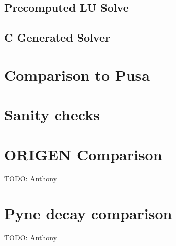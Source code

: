 \documentclass{article}
\makeatletter
\let\oldcite=\cite
\renewcommand\cite[1]{\ifthenelse{\equal{#1}{ationneeded}}{{\color{red}[citation~needed]}}{\oldcite{#1}}}
\newcommand\todo[1]{{\color{red}TODO\@: #1}}
\makeatother
\begin{document}
\subsection{Precomputed LU Solve}
\label{sec:precomputed-lu-solve}


\subsection{C Generated Solver}
\label{sec:c-solve}


\section{Comparison to Pusa~\oldcite{pusa2012correction}}
\label{sec:pusa-comparison}


\section{Sanity checks}
\label{sec:sanity-checks}


\section{ORIGEN Comparison}
\todo{Anthony}
\label{sec:origen-comparison}


\section{Pyne decay comparison}
\todo{Anthony}

\clearpage

\end{document}
